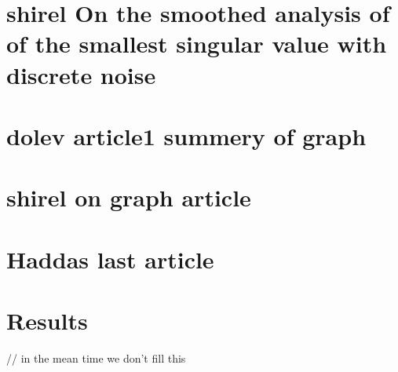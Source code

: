 \documentclass[12pt]{article}
\begin{document}


\section{shirel On the smoothed analysis of of the smallest singular value with discrete noise}



\section{dolev article1 summery of graph}



\section{shirel on graph article}



\section{Haddas last article}



\section{Results}
// in the mean time we don't fill this

\newpage
\printbibliography
\end{document}

